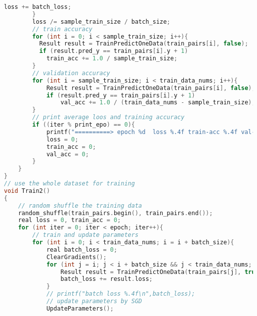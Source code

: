 \documentclass{article}
\begin{document}
\begin{lstlisting}[language=c++]
            loss += batch_loss;
        }
        loss /= sample_train_size / batch_size;
        // train accuracy
        for (int i = 0; i < sample_train_size; i++){
          Result result = TrainPredictOneData(train_pairs[i], false);
          if (result.pred_y == train_pairs[i].y + 1)
            train_acc += 1.0 / sample_train_size;
        }
        // validation accuracy
        for (int i = sample_train_size; i < train_data_nums; i++){
            Result result = TrainPredictOneData(train_pairs[i], false);
            if (result.pred_y == train_pairs[i].y + 1)
                val_acc += 1.0 / (train_data_nums - sample_train_size);
        }
        // print average loos and training accuracy
        if ((iter % print_epo) == 0){
            printf("==========> epoch %d  loss %.4f train-acc %.4f val-acc %.4f\n", iter, loss / print_epo, train_acc / print_epo, val_acc / print_epo);
            loss = 0;
            train_acc = 0;
            val_acc = 0;
        }
    }
}
// use the whole dataset for training
void Train2()
{
    // random shuffle the training data
    random_shuffle(train_pairs.begin(), train_pairs.end());
    real loss = 0, train_acc = 0;
    for (int iter = 0; iter < epoch; iter++){
        // train and update parameters
        for (int i = 0; i < train_data_nums; i = i + batch_size){
            real batch_loss = 0;
            ClearGradients();
            for (int j = i; j < i + batch_size && j < train_data_nums; j++){
                Result result = TrainPredictOneData(train_pairs[j], true);
                batch_loss += result.loss;
            }
            // printf("batch loss %.4f\n",batch_loss);
            // update parameters by SGD
            UpdateParameters();
            

\end{lstlisting}
\end{document}
